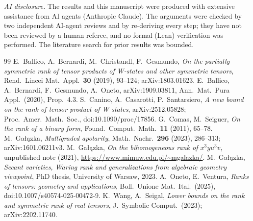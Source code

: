 \documentclass[11pt]{amsart}
\theoremstyle{remark}
\begin{document}
\emph{AI disclosure.} The results and this manuscript were produced with extensive assistance from AI agents (Anthropic Claude). The arguments were checked by two independent AI-agent reviews and by re-deriving every step; they have not been reviewed by a human referee, and no formal (Lean) verification was performed. The literature search for prior results was bounded.

\begin{thebibliography}{99}
 E.~Ballico, A.~Bernardi, M.~Christandl, F.~Gesmundo, \emph{On the partially symmetric rank of tensor products of W-states and other symmetric tensors}, Rend.\ Lincei Mat.\ Appl.\ \textbf{30} (2019), 93--124; arXiv:1803.01623.
 E.~Ballico, A.~Bernardi, F.~Gesmundo, A.~Oneto, arXiv:1909.03811, Ann.\ Mat.\ Pura Appl.\ (2020), Prop.~4.3.
 S.~Canino, A.~Casarotti, P.~Santarsiero, \emph{A new bound on the rank of tensor product of W-states}, arXiv:2512.05828; Proc.\ Amer.\ Math.\ Soc., doi:10.1090/proc/17856.
 G.~Comas, M.~Seiguer, \emph{On the rank of a binary form}, Found.\ Comput.\ Math.\ \textbf{11} (2011), 65--78.
 M.~Ga{\l}\k{a}zka, \emph{Multigraded apolarity}, Math.\ Nachr.\ \textbf{296} (2023), 286--313; arXiv:1601.06211v3.
 M.~Ga{\l}\k{a}zka, \emph{On the bihomogeneous rank of $x^3yu^3v$}, unpublished note (2021), \url{https://www.mimuw.edu.pl/~mgalazka/}.
 M.~Ga{\l}\k{a}zka, \emph{Secant varieties, Waring rank and generalizations from algebraic geometry viewpoint}, PhD thesis, University of Warsaw, 2023.
 A.~Oneto, E.~Ventura, \emph{Ranks of tensors: geometry and applications}, Boll.\ Unione Mat.\ Ital.\ (2025), doi:10.1007/s40574-025-00472-9.
 K.~Wang, A.~Seigal, \emph{Lower bounds on the rank and symmetric rank of real tensors}, J.\ Symbolic Comput.\ (2023); arXiv:2202.11740.
\end{thebibliography}
\end{document}
